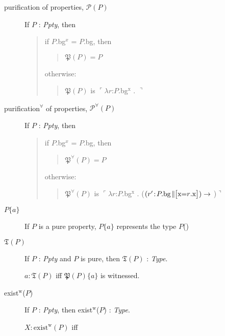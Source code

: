 \begin{description}
\begin{description}
      \item[purification of properties, \textnormal{$\mathcal{P}(P)$}]\mbox{}

        If $P$ : \textit{Ppty}, then
\begin{quote}
if $P$.bg$^x$ = $P$.bg, then
\begin{quote}
$\mathfrak{P}(P)=P$
\end{quote}
otherwise:
\begin{quote}
$\mathfrak{P}(P)$ is $\ulcorner\lambda r$:$P$.bg$^{\text{x}}$
. $\urcorner$
\end{quote}
\end{quote}
\item[purification$^\forall$ of properties, \textnormal{$\mathcal{P}^\forall(P)$}]\mbox{}

  If $P$ : \textit{Ppty}, then
\begin{quote}
if $P$.bg$^x$ = $P$.bg, then
\begin{quote}
$\mathfrak{P^\forall}(P)=P$
\end{quote}
otherwise:
\begin{quote}
$\mathfrak{P^\forall}(P)$ is $\ulcorner\lambda r$:$P$.bg$^{\text{x}}$
. ($(r'\!:\!P.\text{bg}\!\parallel\!\!\text{\smallrecord{\field{x}{$r$.x}}})\rightarrow$
)$\urcorner$
\end{quote}
\end{quote}
\item[\textnormal{$P\{a\}$}] \mbox{}

  If $P$ is a pure property, $P\{a\}$
  represents the type $P$()

\item[\textnormal{$\mathfrak{T}(P)$}] \mbox{}

  If $P$ : \textit{Ppty} and $P$ is pure, then $\mathfrak{T}(P)$ : \textit{Type}.

  $a:\mathfrak{T}(P)$ iff $\mathfrak{P}(P)\{a\}$ is witnessed.
  
\item[\textnormal{exist$^{\text{w}}$($P$)}] \mbox{}

  If $P$ : \textit{Ppty}, then exist$^{\text{w}}$($P$) :
  \textit{Type}.

  $X:\text{exist}^{\text{w}}(P)$ iff
\begin{enumerate} 
 

\end{enumerate}
\end{description}
\end{description}
